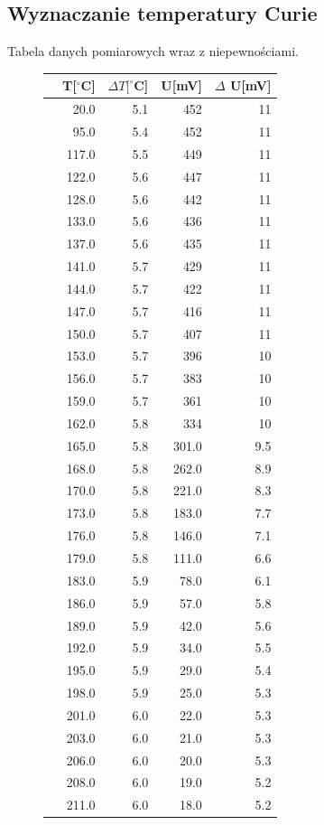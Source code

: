 \documentclass[a4paper,10pt]{article}
\begin{document}
\subsection{Wyznaczanie temperatury Curie}
Tabela danych pomiarowych wraz z niepewnościami.
\begin{figure}[H]
\begin{tabular}{lrrrr}
\hline
{} &T[$^\circ$C]&$\Delta T[^\circ$C]&U[mV]&$\Delta$ U[mV]\\
\hline
  &   20.0 &  5.1 &  452 &  11 \\
  &   95.0 &  5.4 &  452 &  11 \\
  &  117.0 &  5.5 &  449 &  11 \\
  &  122.0 &  5.6 &  447 &  11 \\
  &  128.0 &  5.6 &  442 &  11 \\
  &  133.0 &  5.6 &  436 &  11 \\
  &  137.0 &  5.6 &  435 &  11 \\
  &  141.0 &  5.7 &  429 &  11 \\
  &  144.0 &  5.7 &  422 &  11 \\
  &  147.0 &  5.7 &  416 &  11 \\
 &  150.0 &  5.7 &  407 &  11 \\
 &  153.0 &  5.7 &  396 &  10 \\
 &  156.0 &  5.7 &  383 &  10 \\
 &  159.0 &  5.7 &  361 &  10 \\
 &  162.0 &  5.8 &  334 &  10 \\
 &  165.0 &  5.8 &  301.0 &   9.5 \\
 &  168.0 &  5.8 &  262.0 &   8.9 \\
 &  170.0 &  5.8 &  221.0 &   8.3 \\
 &  173.0 &  5.8 &  183.0 &   7.7 \\
 &  176.0 &  5.8 &  146.0 &   7.1 \\
 &  179.0 &  5.8 &  111.0 &   6.6 \\
 &  183.0 &  5.9 &   78.0 &   6.1 \\
 &  186.0 &  5.9 &   57.0 &   5.8 \\
 &  189.0 &  5.9 &   42.0 &   5.6 \\
 &  192.0 &  5.9 &   34.0 &   5.5 \\
 &  195.0 &  5.9 &   29.0 &   5.4 \\
 &  198.0 &  5.9 &   25.0 &   5.3 \\
 &  201.0 &  6.0 &   22.0 &   5.3 \\
 &  203.0 &  6.0 &   21.0 &   5.3 \\
 &  206.0 &  6.0 &   20.0 &   5.3 \\
 &  208.0 &  6.0 &   19.0 &   5.2 \\
 &  211.0 &  6.0 &   18.0 &   5.2 \\
\hline
\end{tabular}
\end{figure}
\end{document}
